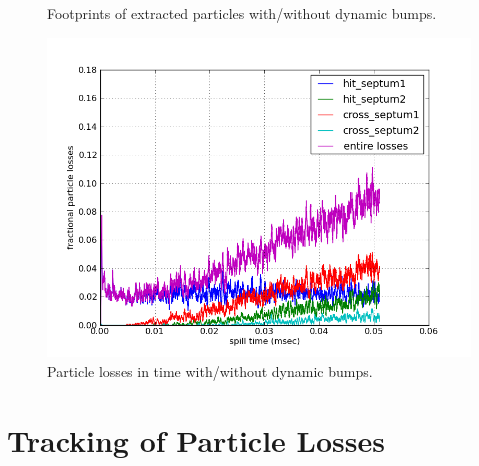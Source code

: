 \documentclass[aps,prstab,onecolumn,preprint,endfloats,11pt]{revtex4-1}
\begin{document}



\begin{figure}[!tbp]
  \caption{\label{fig:bump3}Footprints of extracted particles with/without dynamic bumps.}
\end{figure}

\begin{figure}[!htbp]
  \includegraphics[width=.45\textwidth]{img/20140203-06.png}
  \caption{\label{fig:bump4}Particle losses in time with/without dynamic bumps.}
\end{figure}

\clearpage

\section{\label{sec:loss}Tracking of Particle Losses}
\end{document}
